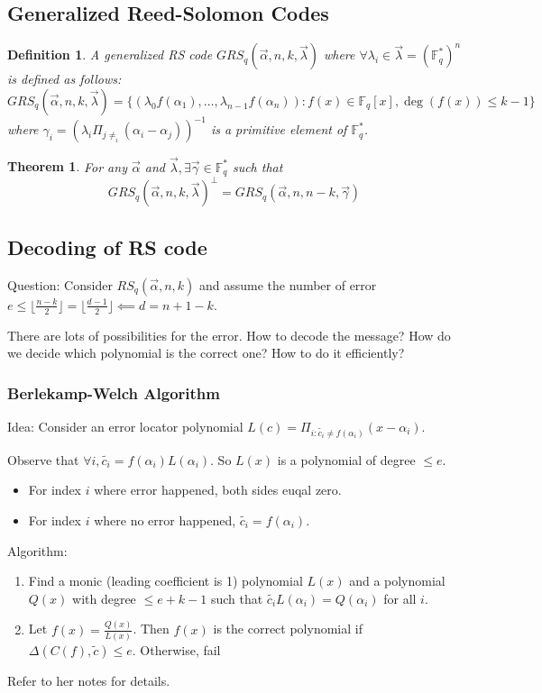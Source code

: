 \documentclass[letterpaper,12pt]{article}
\newtheorem{theorem}{Theorem}
\newtheorem{definition}{Definition}
\begin{document}
\subsection{Generalized Reed-Solomon Codes}
\begin{definition}
    A generalized RS code $GRS_q(\vec{\alpha},n,k, \vec{\lambda})$ where $\forall \lambda_i \in \vec{\lambda} = (\mathbb{F}_q^*)^n$ is defined as follows: \[
        GRS_q(\vec{\alpha},n,k, \vec{\lambda}) = \{(\lambda_0f(\alpha_1),\ldots,\lambda_{n-1}f(\alpha_n)): f(x)\in \mathbb{F}_q[x], \deg(f(x))\le k-1\}
    \]
    where $\gamma_i = (\lambda_i \Pi_{j\neq _i}(\alpha_i-\alpha_j))^{-1}$ is a
    primitive element of $\mathbb{F}_q^*$.
\end{definition}
\begin{theorem}
    For any $\vec{\alpha}$ and $\vec{\lambda}, \exists \vec{\gamma} \in \mathbb{F}_q^*$ such that \[
        GRS_q(\vec{\alpha},n,k, \vec{\lambda})^{\perp} = GRS_q(\vec{\alpha},n,n-k, \vec{\gamma})
    \]
\end{theorem}
\subsection{Decoding of RS code}
Question: Consider $RS_q(\vec{\alpha},n,k)$ and assume the number of error
$e\le \lfloor \frac{n-k}{2} \rfloor = \lfloor \frac{d-1}{2} \rfloor \impliedby
    d=n+1-k$.

There are lots of possibilities for the error. How to decode the message? How
do we decide which polynomial is the correct one? How to do it efficiently?
\subsubsection{Berlekamp-Welch Algorithm}
Idea: Consider an error locator polynomial $L(c)=\Pi_{i: \tilde{c_i}\neq
        f(\alpha_i)}(x-\alpha_i)$.

Observe that $\forall i, \tilde{c_i}=f(\alpha_i)L(\alpha_i)$. So $L(x)$ is a
polynomial of degree $\le e$. \begin{itemize}
    \item For index $i$ where error happened, both sides euqal zero.
    \item For index $i$ where no error happened, $\tilde{c_i}=f(\alpha_i)$.
\end{itemize}

Algorithm: \begin{enumerate}
    \item Find a monic (leading coefficient is 1) polynomial $L(x)$ and a polynomial
          $Q(x)$ with degree $\le e+k-1$ such that $\tilde{c_i}L(\alpha_i)=Q(\alpha_i)$
          for all $i$.
    \item Let $f(x)=\frac{Q(x)}{L(x)}$. Then $f(x)$ is the correct polynomial if
          $\Delta(C(f),\tilde{c})\le e$. Otherwise, fail
\end{enumerate}
Refer to her notes for details.
\end{document}
